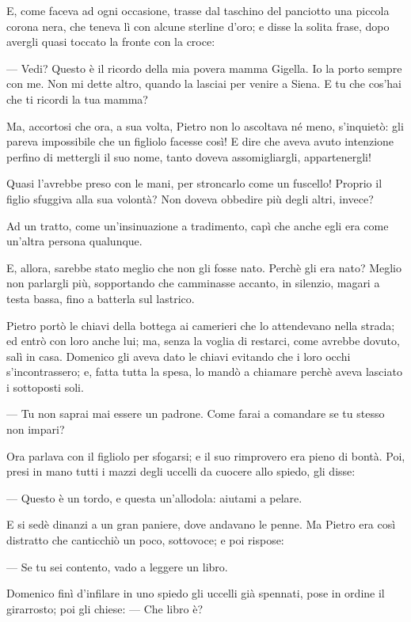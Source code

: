 E, come faceva ad ogni occasione, trasse dal taschino del panciotto una piccola corona nera, che teneva lì con alcune sterline d'oro; e disse la solita frase, dopo avergli quasi toccato la fronte con la croce:

— Vedi? Questo è il ricordo della mia povera mamma Gigella. Io la porto sempre con me. Non mi dette altro, quando la lasciai per venire a Siena. E tu che cos'hai che ti ricordi la tua mamma?

Ma, accortosi che ora, a sua volta, Pietro non lo ascoltava né meno, s'inquietò: gli pareva impossibile che un figliolo facesse così! E dire che aveva avuto intenzione perfino di mettergli il suo nome, tanto doveva assomigliargli, appartenergli!

Quasi l'avrebbe preso con le mani, per stroncarlo come un fuscello! Proprio il figlio sfuggiva alla sua volontà? Non doveva obbedire più degli altri, invece?

Ad un tratto, come un'insinuazione a tradimento, capì che anche egli era come un'altra persona qualunque.

E, allora, sarebbe stato meglio che non gli fosse nato. Perchè gli era nato? Meglio non parlargli più, sopportando che camminasse accanto, in silenzio, magari a testa bassa, fino a batterla sul lastrico.

Pietro portò le chiavi della bottega ai camerieri che lo attendevano nella strada; ed entrò con loro anche lui; ma, senza la voglia di restarci, come avrebbe dovuto, salì in casa. Domenico gli aveva dato le chiavi evitando che i loro occhi s'incontrassero; e, fatta tutta la spesa, lo mandò a chiamare perchè aveva lasciato i sottoposti soli.

— Tu non saprai mai essere un padrone. Come farai a comandare se tu stesso non impari?

Ora parlava con il figliolo per sfogarsi; e il suo rimprovero era pieno di bontà. Poi, presi in mano tutti i mazzi degli uccelli da cuocere allo spiedo, gli disse:

— Questo è un tordo, e questa un'allodola: aiutami a pelare.

E si sedè dinanzi a un gran paniere, dove andavano le penne. Ma Pietro era così distratto che canticchiò un poco, sottovoce; e poi rispose:

— Se tu sei contento, vado a leggere un libro.

Domenico finì d'infilare in uno spiedo gli uccelli già spennati, pose in ordine il girarrosto; poi gli chiese: — Che libro è?

